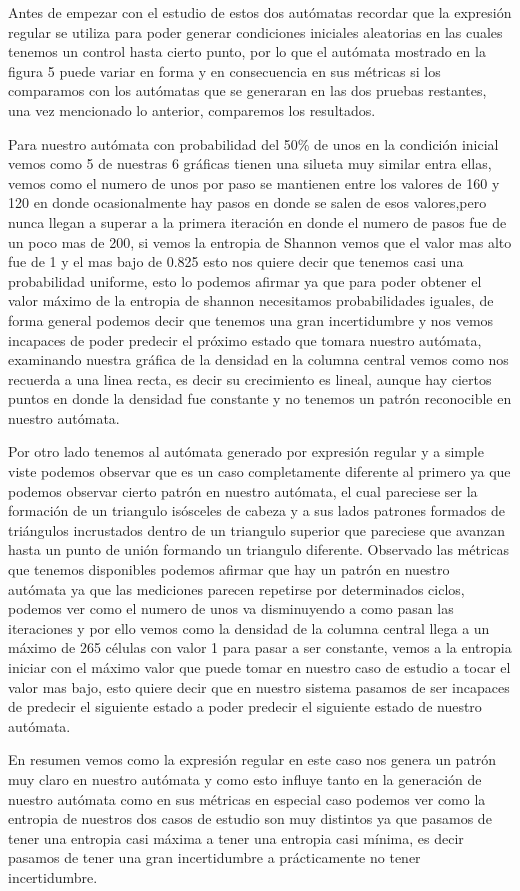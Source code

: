 \documentclass[11pt]{article}
\begin{document}
		Antes de empezar con el estudio de estos dos autómatas recordar que la expresión regular se utiliza para poder generar condiciones iniciales aleatorias en las cuales tenemos un control hasta cierto punto, por lo que el autómata mostrado en la figura 5 puede variar en forma y en consecuencia en sus métricas si los comparamos con los autómatas que se generaran en las dos pruebas restantes, una vez mencionado lo anterior, comparemos los resultados.\par
		 Para nuestro autómata con probabilidad del 50\% de unos en la condición inicial vemos como 5 de nuestras 6 gráficas tienen una silueta muy similar entra ellas, vemos como el numero de unos por paso se mantienen entre los valores de 160 y 120 en donde ocasionalmente hay pasos en donde se salen de esos valores,pero nunca llegan a superar a la primera iteración en donde el numero de pasos fue de un poco mas de 200, si vemos la entropia de Shannon vemos que el valor mas alto fue de 1 y el mas bajo de 0.825 esto nos quiere decir que tenemos casi una probabilidad uniforme, esto lo podemos afirmar ya que para poder obtener el valor máximo de la entropia de shannon necesitamos probabilidades iguales, de forma general podemos decir que tenemos una gran incertidumbre y nos vemos incapaces de poder predecir el próximo estado que tomara nuestro autómata, examinando nuestra gráfica de la densidad en la columna central vemos como nos recuerda a una linea recta, es decir su crecimiento es lineal, aunque hay ciertos puntos en donde la densidad fue constante y no tenemos un patrón reconocible en nuestro autómata.\par
		 Por otro lado tenemos al autómata generado por expresión regular y a simple viste podemos observar que es un caso completamente diferente al primero ya que podemos observar cierto patrón en nuestro autómata, el cual pareciese ser la formación de un triangulo isósceles de cabeza y a sus lados patrones formados de triángulos incrustados dentro de un triangulo superior que pareciese que avanzan hasta un punto de unión formando un triangulo diferente. Observado las métricas que tenemos disponibles podemos afirmar que hay un patrón en nuestro autómata ya que las mediciones parecen repetirse por determinados ciclos, podemos ver como el numero de unos va disminuyendo a como pasan las iteraciones y por ello vemos como la densidad de la columna central llega a un máximo de 265 células con valor 1 para pasar a ser constante, vemos a la entropia iniciar con el máximo valor que puede tomar en nuestro caso de estudio a tocar el valor mas bajo, esto quiere decir que en nuestro sistema pasamos de ser incapaces de predecir el siguiente estado a poder predecir el siguiente estado de nuestro autómata.\par
		 En resumen vemos como la expresión regular en este caso nos genera un patrón muy claro en nuestro autómata y como esto influye tanto en la generación de nuestro autómata como en sus métricas en especial caso podemos ver como la entropia de nuestros dos casos de estudio son muy distintos ya que pasamos de tener una entropia casi máxima a tener una entropia casi mínima, es decir pasamos de tener una gran incertidumbre a prácticamente no tener incertidumbre.
\end{document}
